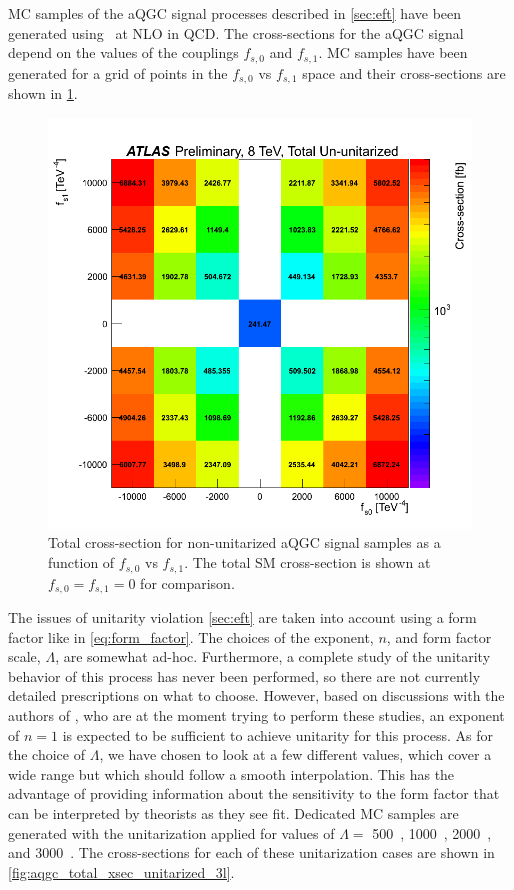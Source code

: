 
MC samples of the aQGC signal processes described in \sec\ref{sec:eft}
have been generated using \vbfnlo~at NLO in QCD.  %
The cross-sections for the aQGC signal depend on the values
of the couplings $f_{s,0}$ and $f_{s,1}$. MC samples have 
been generated for a grid of points in the $f_{s,0}$ vs $f_{s,1}$ space
and their cross-sections are shown in \fig\ref{fig:aqgc_total_xsec_ununitarized_3l}. %

\begin{figure}[ht!]
\centering
\includegraphics[width=.8\textwidth]{figures/aQGC/total_xsec/www_3l_aqgc_total_ununitarized_noratio.png}
\caption{Total cross-section for non-unitarized aQGC signal samples as a function of $f_{s,0}$ vs $f_{s,1}$.
The total SM cross-section is shown at $f_{s,0}=f_{s,1}=0$ for comparison.}
\label{fig:aqgc_total_xsec_ununitarized_3l}
\end{figure}

The issues of unitarity violation \sec\ref{sec:eft} are taken
into account using a form factor like in \eqn\eqref{eq:form_factor}.
The choices of the exponent, $n$, and form factor scale, $\Lambda$, 
are somewhat ad-hoc. Furthermore, a complete study of the unitarity
behavior of this process has never been performed, so there are not
currently detailed prescriptions on what to choose. 
However, based on discussions with the authors of \vbfnlo, who
are at the moment trying to perform these studies, an exponent
of $n=1$ is expected to be sufficient to achieve unitarity 
for this process.  As for the choice of $\Lambda$, we have
chosen to look at a few different values, which cover a wide
range but which should follow a smooth interpolation. 
This has the advantage of providing information about the
sensitivity to the form factor that can be interpreted 
by theorists as they see fit. Dedicated MC samples
are generated with the unitarization applied for values
of $\Lambda =$ 500~\GeV, 1000~\GeV, 2000~\GeV, and 3000~\GeV.
The cross-sections for each of these unitarization cases
are shown in \fig\ref{fig:aqgc_total_xsec_unitarized_3l}.

